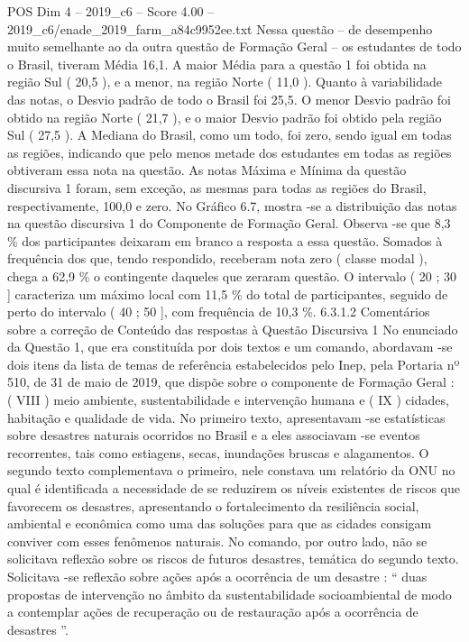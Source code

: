 \begin{textsample}{POS Dim 4 – 2019\_c6 – Score 4.00 – 2019\_c6/enade\_2019\_farm\_a84c9952ee.txt}
Nessa questão – de desempenho muito semelhante ao da outra questão de Formação Geral – os estudantes de todo o Brasil, tiveram Média 16,1.
A maior Média para a questão 1 foi obtida na região Sul ( 20,5 ), e a menor, na região Norte ( 11,0 ).
Quanto à variabilidade das notas, o Desvio padrão de todo o Brasil foi 25,5.
O menor Desvio padrão foi obtido na região Norte ( 21,7 ), e o maior Desvio padrão foi obtido pela região Sul ( 27,5 ).
A Mediana do Brasil, como um todo, foi zero, sendo igual em todas as regiões, indicando que pelo menos metade dos estudantes em todas as regiões obtiveram essa nota na questão.
As notas Máxima e Mínima da questão discursiva 1 foram, sem exceção, as mesmas para todas as regiões do Brasil, respectivamente, 100,0 e zero.
No Gráfico 6.7, mostra -se a distribuição das notas na questão discursiva 1 do Componente de Formação Geral.
Observa -se que 8,3 \% dos participantes deixaram em branco a resposta a essa questão.
Somados à frequência dos que, tendo respondido, receberam nota zero ( classe modal ), chega a 62,9 \% o contingente daqueles que zeraram questão.
O intervalo ( 20 ; 30 ] caracteriza um máximo local com 11,5 \% do total de participantes, seguido de perto do intervalo ( 40 ; 50 ], com frequência de 10,3 \%. 6.3.1.2 Comentários sobre a correção de Conteúdo das respostas à Questão Discursiva 1 No enunciado da Questão 1, que era constituída por dois textos e um comando, abordavam -se dois itens da lista de temas de referência estabelecidos pelo Inep, pela Portaria nº 510, de 31 de maio de 2019, que dispõe sobre o componente de Formação Geral : ( VIII ) meio ambiente, sustentabilidade e intervenção humana e ( IX ) cidades, habitação e qualidade de vida.
No primeiro texto, apresentavam -se estatísticas sobre desastres naturais ocorridos no Brasil e a eles associavam -se eventos recorrentes, tais como estiagens, secas, inundações bruscas e alagamentos.
O segundo texto complementava o primeiro, nele constava um relatório da ONU no qual é identificada a necessidade de se reduzirem os níveis existentes de riscos que favorecem os desastres, apresentando o fortalecimento da resiliência social, ambiental e econômica como uma das soluções para que as cidades consigam conviver com esses fenômenos naturais.
No comando, por outro lado, não se solicitava reflexão sobre os riscos de futuros desastres, temática do segundo texto.
Solicitava -se reflexão sobre ações após a ocorrência de um desastre : “ duas propostas de intervenção no âmbito da sustentabilidade socioambiental de modo a contemplar ações de recuperação ou de restauração após a ocorrência de desastres ”.

\end{textsample}
